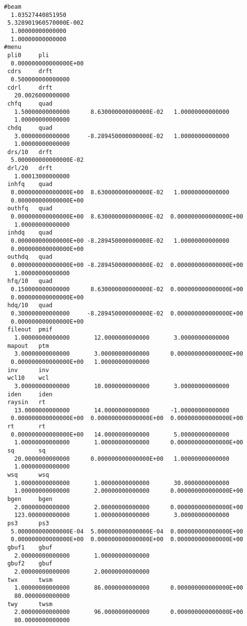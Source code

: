 \begin{footnotesize}
\begin{verbatim}
#beam
  1.03527440851950
 5.328901960570000E-002
  1.00000000000000
  1.00000000000000
#menu
 pli0     pli
  0.000000000000000E+00
 cdrs     drft
  0.500000000000000
 cdrl     drft
   20.0026000000000
 chfq     quad
   1.50000000000000      8.630000000000000E-02   1.00000000000000
   1.00000000000000
 chdq     quad
   3.00000000000000     -8.289450000000000E-02   1.00000000000000
   1.00000000000000
 drs/10   drft
  5.000000000000000E-02
 drl/20   drft
   1.00013000000000
 inhfq    quad
  0.000000000000000E+00  8.630000000000000E-02   1.00000000000000
  0.000000000000000E+00
 outhfq   quad
  0.000000000000000E+00  8.630000000000000E-02  0.000000000000000E+00
   1.00000000000000
 inhdq    quad
  0.000000000000000E+00 -8.289450000000000E-02   1.00000000000000
  0.000000000000000E+00
 outhdq   quad
  0.000000000000000E+00 -8.289450000000000E-02  0.000000000000000E+00
   1.00000000000000
 hfq/10   quad
  0.150000000000000      8.630000000000000E-02  0.000000000000000E+00
  0.000000000000000E+00
 hdq/10   quad
  0.300000000000000     -8.289450000000000E-02  0.000000000000000E+00
  0.000000000000000E+00
 fileout  pmif
   1.00000000000000       12.0000000000000       3.00000000000000
 mapout   ptm
   3.00000000000000       3.00000000000000      0.000000000000000E+00
  0.000000000000000E+00   1.00000000000000
 inv      inv
 wcl10    wcl
   3.00000000000000       10.0000000000000       3.00000000000000
 iden     iden
 raysin   rt
   13.0000000000000       14.0000000000000      -1.00000000000000
  0.000000000000000E+00  0.000000000000000E+00  0.000000000000000E+00
 rt       rt
  0.000000000000000E+00   14.0000000000000       5.00000000000000
   1.00000000000000       1.00000000000000      0.000000000000000E+00
 sq       sq
   20.0000000000000      0.000000000000000E+00   1.00000000000000
   1.00000000000000
 wsq      wsq
   1.00000000000000       1.00000000000000       30.0000000000000
   1.00000000000000       2.00000000000000      0.000000000000000E+00
 bgen     bgen
   2.00000000000000       2.00000000000000      0.000000000000000E+00
   123.000000000000       1.00000000000000       3.00000000000000
 ps3      ps3
  5.000000000000000E-04  5.000000000000000E-04  0.000000000000000E+00
  0.000000000000000E+00  0.000000000000000E+00  0.000000000000000E+00
 gbuf1    gbuf
   2.00000000000000       1.00000000000000
 gbuf2    gbuf
   2.00000000000000       2.00000000000000
 twx      twsm
   1.00000000000000       86.0000000000000      0.000000000000000E+00
   80.0000000000000
 twy      twsm
   2.00000000000000       96.0000000000000      0.000000000000000E+00
   80.0000000000000

\end{verbatim}
\end{footnotesize}
